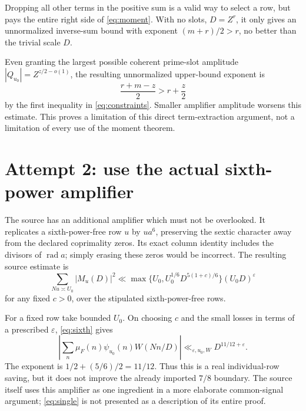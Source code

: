\documentclass[11pt]{article}
\begin{document}
Dropping all other terms in the positive sum is a valid way to select a
row, but pays the entire right side of \eqref{eq:moment}. With no slots,
$D=Z^r$, it only gives an unnormalized inverse-sum bound with exponent
$(m+r)/2>r$, no better than the trivial scale $D$.

Even granting the largest possible coherent prime-slot amplitude
$|Q_{u_0}|=Z^{z/2-o(1)}$, the resulting unnormalized upper-bound exponent is
\[
 \frac{r+m-z}{2}>r+\frac z2
\]
by the first inequality in \eqref{eq:constraints}. Smaller amplifier
amplitude worsens this estimate. This proves a limitation of this direct
term-extraction argument, not a limitation of every use of the moment
theorem.

\section{Attempt 2: use the actual sixth-power amplifier}
The source has an additional amplifier which must not be overlooked.
It replicates a sixth-power-free row $u$ by $ua^6$, preserving the sextic
character away from the declared coprimality zeros. Its exact column
identity includes the divisors of $\operatorname{rad}a$; simply erasing
these zeros would be incorrect. The resulting source estimate is
\begin{equation}\label{eq:sixth}
 \sum_{Nu\asymp U_0}|M_u(D)|^2
 \ll\max\{U_0,U_0^{1/6}D^{5(1+c)/6}\}(U_0D)^\varepsilon
\end{equation}
for any fixed $c>0$, over the stipulated sixth-power-free rows.

For a fixed row take bounded $U_0$. On choosing $c$ and the small losses
in terms of a prescribed $\varepsilon$, \eqref{eq:sixth} gives
\begin{equation}\label{eq:single}
 \left|\sum_n\mu_F(n)\psi_{u_0}(n)W(Nn/D)\right|
           \ll_{\varepsilon,u_0,W}D^{11/12+\varepsilon}.
\end{equation}
The exponent is $1/2+(5/6)/2=11/12$. Thus this is a real individual-row
saving, but it does not improve the already imported $7/8$ boundary.
The source itself uses this amplifier as one ingredient in a more
elaborate common-signal argument; \eqref{eq:single} is not presented as
a description of its entire proof.
\end{document}
